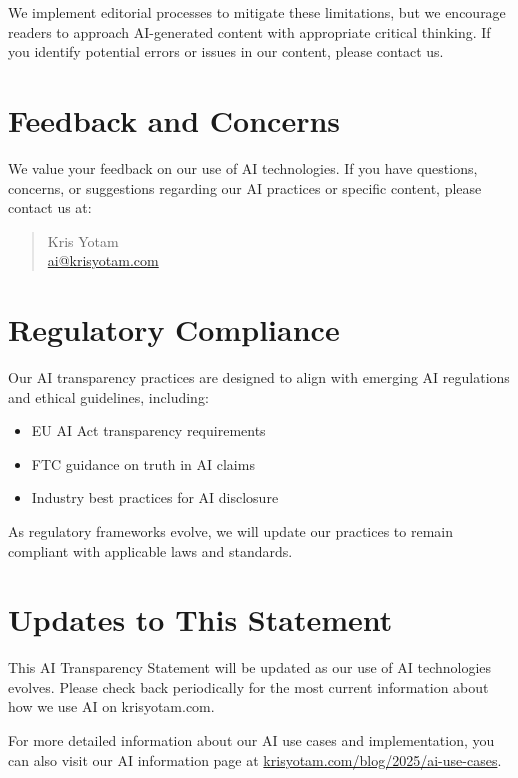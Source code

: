 \documentclass[11pt]{article}
\begin{document}
We implement editorial processes to mitigate these limitations, but we encourage readers to approach AI-generated content with appropriate critical thinking. If you identify potential errors or issues in our content, please contact us.

\section{Feedback and Concerns}
We value your feedback on our use of AI technologies. If you have questions, concerns, or suggestions regarding our AI practices or specific content, please contact us at:

\begin{quote}
  Kris Yotam\\
  \href{mailto:ai@krisyotam.com}{ai@krisyotam.com}
\end{quote}

\section{Regulatory Compliance}
Our AI transparency practices are designed to align with emerging AI regulations and ethical guidelines, including:
\begin{itemize}
  \item EU AI Act transparency requirements
  \item FTC guidance on truth in AI claims
  \item Industry best practices for AI disclosure
\end{itemize}

As regulatory frameworks evolve, we will update our practices to remain compliant with applicable laws and standards.

\section{Updates to This Statement}
This AI Transparency Statement will be updated as our use of AI technologies evolves. Please check back periodically for the most current information about how we use AI on krisyotam.com.

For more detailed information about our AI use cases and implementation, you can also visit our AI information page at \href{https://krisyotam.com/blog/2025/ai-use-cases}{krisyotam.com/blog/2025/ai-use-cases}.
\end{document}
